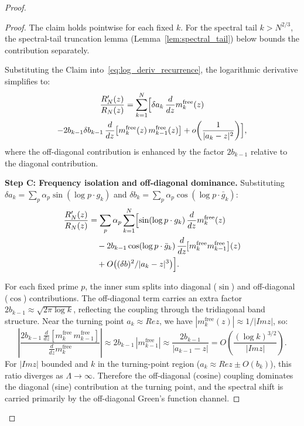 \documentclass{pre-aomart}
\def\Re{Re}%
\def\Im{Im}%
\theoremstyle{plain}
\theoremstyle{definition}
\theoremstyle{remark}
\begin{document}
\begin{proof}
\begin{proof}
\noindent The claim holds pointwise for each fixed $k$.  For the
spectral tail $k > N^{2/3}$, the spectral-tail truncation
lemma (Lemma~\ref{lem:spectral_tail}) below bounds the contribution
separately.

Substituting the Claim into~\eqref{eq:log_deriv_recurrence},
the logarithmic derivative simplifies to:
\begin{multline}\label{eq:log_deriv_simple}
\frac{R_N'(z)}{R_N(z)} = \sum_{k=1}^{N}\Bigl[
  \delta a_k\,\frac{d}{dz}m_k^{\mathrm{free}}(z)\\
  - 2b_{k-1}\delta b_{k-1}\,\frac{d}{dz}\bigl[m_k^{\mathrm{free}}(z)\,m_{k-1}^{\mathrm{free}}(z)\bigr]
  + o\!\left(\frac{1}{|a_k - z|^2}\right)\Bigr],
\end{multline}
where the off-diagonal contribution is enhanced by the factor $2b_{k-1}$
relative to the diagonal contribution.

\textbf{Step C: Frequency isolation and off-diagonal dominance.}
Substituting $\delta a_k = \sum_p \alpha_p\sin(\log p \cdot g_k)$ and
$\delta b_k = \sum_p \alpha_p\cos(\log p \cdot \bar{g}_k)$:
\begin{align}
\frac{R_N'(z)}{R_N(z)} &= \sum_p \alpha_p\sum_{k=1}^{N}\Bigl[
  \sin(\log p \cdot g_k)\,\frac{d}{dz}m_k^{\mathrm{free}}(z) \label{eq:diag_term}\\
  &\quad - 2b_{k-1}\cos(\log p \cdot \bar{g}_k)\,
    \frac{d}{dz}\!\bigl[m_k^{\mathrm{free}} m_{k-1}^{\mathrm{free}}\bigr](z)
    \notag\\
  &\quad + O\bigl((\delta b)^2/|a_k - z|^3\bigr)\Bigr]. \notag
\end{align}

For each fixed prime $p$, the inner sum splits into diagonal ($\sin$) and
off-diagonal ($\cos$) contributions.
The off-diagonal term carries an extra factor
$2b_{k-1} \approx \sqrt{2\pi\log k}$, reflecting the coupling
through the tridiagonal band structure.
Near the turning point $a_k \approx \Re z$, we have
$|m_k^{\mathrm{free}}(z)| \approx 1/|\Im z|$, so:
\[
\left|\frac{2b_{k-1}\,\frac{d}{dz}[m_k^{\mathrm{free}}\,m_{k-1}^{\mathrm{free}}]}
            {\frac{d}{dz}m_k^{\mathrm{free}}}\right|
\approx 2b_{k-1}\,|m_{k-1}^{\mathrm{free}}|
\approx \frac{2b_{k-1}}{|a_{k-1} - z|} = O\!\left(\frac{(\log k)^{3/2}}{|\Im z|}\right).
\]
For $|\Im z|$ bounded and $k$ in the turning-point region
($a_k \approx \Re z \pm O(b_k)$), this ratio diverges as $\Lambda \to \infty$.
Therefore the off-diagonal (cosine) coupling dominates the
diagonal (sine) contribution at the turning point,
and the spectral shift is carried primarily by the
off-diagonal Green's function channel.


\end{proof}
\end{proof}
\end{document}
